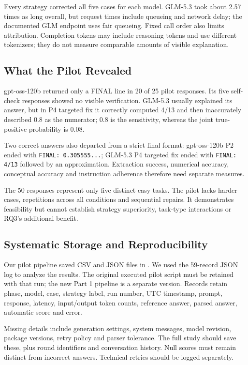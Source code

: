 \documentclass[11pt,letterpaper]{article}
\begin{document}
Every strategy corrected all five cases for each model. GLM-5.3 took about 2.57 times as long overall, but request times include queueing and network delay; the documented GLM endpoint uses fair queueing. Fixed call order also limits attribution. Completion tokens may include reasoning tokens and use different tokenizers; they do not measure comparable amounts of visible explanation.

\subsection*{What the Pilot Revealed}
gpt-oss-120b returned only a FINAL line in 20 of 25 pilot responses. Its five self-check responses showed no visible verification. GLM-5.3 usually explained its answer, but in P4 targeted fix it correctly computed 4/13 and then inaccurately described 0.8 as the numerator; 0.8 is the sensitivity, whereas the joint true-positive probability is 0.08.

Two correct answers also departed from a strict final format: gpt-oss-120b P2 ended with \texttt{FINAL: 0.305555...}; GLM-5.3 P4 targeted fix ended with \texttt{FINAL: 4/13} followed by an approximation. Extraction success, numerical accuracy, conceptual accuracy and instruction adherence therefore need separate measures.

The 50 responses represent only five distinct easy tasks. The pilot lacks harder cases, repetitions across all conditions and sequential repairs. It demonstrates feasibility but cannot establish strategy superiority, task-type interactions or RQ3's additional benefit.

\subsection*{Systematic Storage and Reproducibility}
Our pilot pipeline saved CSV and JSON files in . We used the 59-record JSON log to analyze the results. The original executed pilot script must be retained with that run; the new Part 1 pipeline is a separate version. Records retain phase, model, case, strategy label, run number, UTC timestamp, prompt, response, latency, input/output token counts, reference answer, parsed answer, automatic score and error.

Missing details include generation settings, system messages, model revision, package versions, retry policy and parser tolerance. The full study should save these, plus round identifiers and conversation history. Null scores must remain distinct from incorrect answers. Technical retries should be logged separately.
\end{document}
